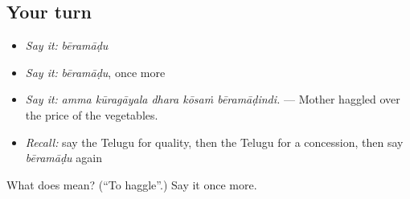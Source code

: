 \subsection*{Your turn}
\begin{itemize}
\raggedright
  \item \emph{Say it:} \emph{bēramāḍu}
  \item \emph{Say it:} \emph{bēramāḍu}, once more
  \item \emph{Say it:} \emph{amma kūragāyala dhara kōsaṁ bēramāḍindi.} — Mother haggled over the price of the vegetables.
  \item \emph{Recall:} say the Telugu for quality, then the Telugu for a concession, then say \emph{bēramāḍu} again
\end{itemize}

\begin{tcolorbox}[breakable,colback=teal!4,colframe=teal!35!black,title={Before you move on}]
What does  mean? (\textquotedblleft{}To haggle\textquotedblright{}.) Say it once more.
\end{tcolorbox}
